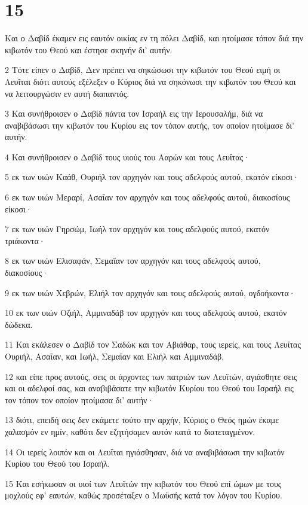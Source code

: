 \chapter{15}

\par Και ο Δαβίδ έκαμεν εις εαυτόν οικίας εν τη πόλει Δαβίδ, και ητοίμασε τόπον διά την κιβωτόν του Θεού και έστησε σκηνήν δι' αυτήν.
\par 2 Τότε είπεν ο Δαβίδ, Δεν πρέπει να σηκώσωσι την κιβωτόν του Θεού ειμή οι Λευΐται διότι αυτούς εξέλεξεν ο Κύριος διά να σηκόνωσι την κιβωτόν του Θεού και να λειτουργώσιν εν αυτή διαπαντός.
\par 3 Και συνήθροισεν ο Δαβίδ πάντα τον Ισραήλ εις την Ιερουσαλήμ, διά να αναβιβάσωσι την κιβωτόν του Κυρίου εις τον τόπον αυτής, τον οποίον ητοίμασε δι' αυτήν.
\par 4 Και συνήθροισεν ο Δαβίδ τους υιούς του Ααρών και τους Λευΐτας·
\par 5 εκ των υιών Καάθ, Ουριήλ τον αρχηγόν και τους αδελφούς αυτού, εκατόν είκοσι·
\par 6 εκ των υιών Μεραρί, Ασαΐαν τον αρχηγόν και τους αδελφούς αυτού, διακοσίους είκοσι·
\par 7 εκ των υιών Γηρσώμ, Ιωήλ τον αρχηγόν και τους αδελφούς αυτού, εκατόν τριάκοντα·
\par 8 εκ των υιών Ελισαφάν, Σεμαΐαν τον αρχηγόν και τους αδελφούς αυτού, διακοσίους·
\par 9 εκ των υιών Χεβρών, Ελιήλ τον αρχηγόν και τους αδελφούς αυτού, ογδοήκοντα·
\par 10 εκ των υιών Οζιήλ, Αμμιναδάβ τον αρχηγόν και τους αδελφούς αυτού, εκατόν δώδεκα.
\par 11 Και εκάλεσεν ο Δαβίδ τον Σαδώκ και τον Αβιάθαρ, τους ιερείς, και τους Λευΐτας Ουριήλ, Ασαΐαν, και Ιωήλ, Σεμαΐαν και Ελιήλ και Αμμιναδάβ,
\par 12 και είπε προς αυτούς, σεις οι άρχοντες των πατριών των Λευϊτών, αγιάσθητε σεις και οι αδελφοί σας, και αναβιβάσατε την κιβωτόν Κυρίου του Θεού του Ισραήλ εις τον τόπον τον οποίον ητοίμασα δι' αυτήν·
\par 13 διότι, επειδή σεις δεν εκάμετε τούτο την αρχήν, Κύριος ο Θεός ημών έκαμε χαλασμόν εν ημίν, καθότι δεν εζητήσαμεν αυτόν κατά το διατεταγμένον.
\par 14 Οι ιερείς λοιπόν και οι Λευΐται ηγιάσθησαν, διά να αναβιβάσωσι την κιβωτόν Κυρίου του Θεού του Ισραήλ.
\par 15 Και εσήκωσαν οι υιοί των Λευϊτών την κιβωτόν του Θεού επί ώμων με τους μοχλούς εφ' εαυτών, καθώς προσέταξεν ο Μωϋσής κατά τον λόγον του Κυρίου.

